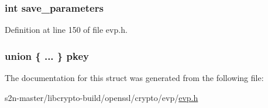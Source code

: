 \subsubsection[{\texorpdfstring{save\+\_\+parameters}{save_parameters}}]{\setlength{\rightskip}{0pt plus 5cm}int save\+\_\+parameters}\hypertarget{structevp__pkey__st_ae04b1afc9989f8cee3a9f537c217cff8}{}\label{structevp__pkey__st_ae04b1afc9989f8cee3a9f537c217cff8}


Definition at line 150 of file evp.\+h.

\subsubsection[{\texorpdfstring{pkey}{pkey}}]{\setlength{\rightskip}{0pt plus 5cm}union \{ ... \}   pkey}\hypertarget{structevp__pkey__st_a548054365936f8f02d25e6cd13a3006e}{}\label{structevp__pkey__st_a548054365936f8f02d25e6cd13a3006e}


The documentation for this struct was generated from the following file\+:\begin{DoxyCompactItemize}
\item 
s2n-\/master/libcrypto-\/build/openssl/crypto/evp/\hyperlink{crypto_2evp_2evp_8h}{evp.\+h}\end{DoxyCompactItemize}
